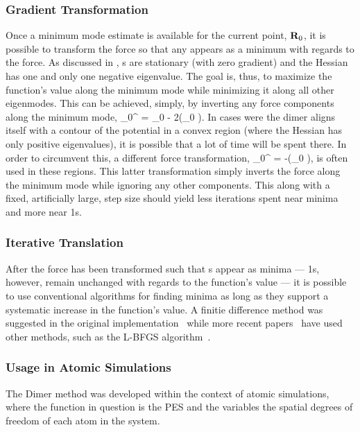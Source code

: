 \subsubsection{Gradient Transformation}
Once a minimum mode estimate is available for the current point, ${\mathrm{\mathbf{\bm{R}}}}_0$, it is possible to transform the force so that any  appears as a minimum with regards to the force.
As discussed in , s are stationary (with zero gradient) and the Hessian has one and only one negative eigenvalue.
The goal is, thus, to maximize the function's value along the minimum mode while minimizing it along all other eigenmodes.
This can be achieved, simply, by inverting any force components along the minimum mode,
\vF_0^ = \vF_0 - 2(\vF_0 \cdot \uvn)\uvn.
\eeq
In cases were the dimer aligns itself with a contour of the potential in a convex region (where the Hessian has only positive eigenvalues), it is possible that a lot of time will be spent there.
In order to circumvent this, a different force transformation,
\vF_0^ = -(\vF_0 \cdot \uvn)\uvn ,
\eeq
is often used in these regions.
This latter transformation simply inverts the force along the minimum mode while ignoring any other components.
This along with a fixed, artificially large, step size should yield less iterations spent near minima and more near \sap1s.~\cite{dimer-original-1999}

\subsubsection{Iterative Translation}
After the force has been transformed such that s appear as minima --- \sap1s, however, remain unchanged with regards to the function's value --- it is possible to use conventional algorithms for finding minima as long as they support a systematic increase in the function's value.
A finitie difference method was suggested in the original implementation~\cite{dimer-original-1999} while more recent papers~\cite{dimer-kastner-2008} have used other methods, such as the L-BFGS algorithm~\cite{lbfgs}.

\subsubsection{Usage in Atomic Simulations}
The Dimer method was developed within the context of atomic simulations, where the function in question is the PES and the variables the spatial degrees of freedom of each atom in the system.

